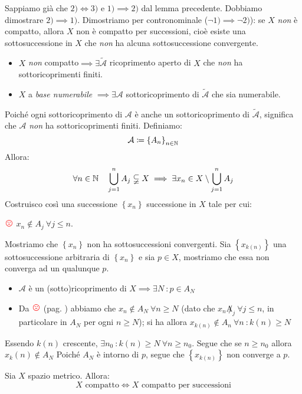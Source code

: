 \begin{demonstration}
Sappiamo già che $2)\iff 3)$ e $1)\implies 2)$ dal lemma precedente. Dobbiamo dimostrare $2)\implies 1)$. Dimostriamo per contronominale ($\neg 1)\implies \neg 2)$): se $X$ \textit{non} è compatto, allora $X$ non è compatto per successioni, cioè esiste una sottosuccessione in $X$ che \textit{non} ha alcuna sottosuccessione convergente.\\
\begin{itemize}
	\item $X$ \textit{non} compatto$\implies \exists \tilde{\mathcal{A}}$ ricoprimento aperto di $X$ che \textit{non} ha sottoricoprimenti finiti.
	\item $X$ a \textit{base numerabile} $\implies\exists\mathcal{A}$ sottoricoprimento di $\tilde{\mathcal{A}}$ che sia numerabile.
\end{itemize}
Poiché ogni sottoricoprimento di $\mathcal{A}$ è anche un sottoricoprimento di $\tilde{\mathcal{A}}$, significa che $\mathcal{A}$ \textit{non} ha sottoricoprimenti finiti. Definiamo:
\begin{equation*}
\mathcal{A}\coloneqq\left\{A_n\right\}_{n\in\mathbb{N}}
\end{equation*}
Allora:
\begin{equation*}
\forall n\in\mathbb{N}\quad \mathop{{\bigcup}}\displaylimits_{j=1}^n A_j\subsetneqq X\implies \exists x_n\in X\setminus \mathop{{\bigcup}}\displaylimits_{j=1}^n A_j
\end{equation*}
Costruisco così una successione $\left\{x_n\right\}$ successione in $X$ tale per cui:
\begin{center}
	\label{notatriste} $\textcolor{red}{{\large \frownie{}}}$ $x_n\notin A_j\ \forall j\leq n$.
\end{center}
Mostriamo che $\left\{x_n\right\}$ non ha sottosuccessioni convergenti. Sia $\left\{x_{k\left(n\right)}\right\}$ una sottosuccessione arbitraria di $\left\{x_n\right\}$ e sia $p\in X$, mostriamo che essa non converga ad un qualunque $p$.\\
\begin{itemize}
	\item $\mathcal{A}$ è un (sotto)ricoprimento di $X\implies \exists N\ \colon p\in A_N$
	\item Da $\textcolor{red}{{\large \frownie{}}}$ (pag. \pageref{notatriste}) abbiamo che $x_n\notin A_N\ \forall n\geq N$ (dato che $x_n\not A_j\ \forall j\leq n$, in particolare in $A_N$ per ogni $n\geq N$); si ha allora $x_{k\left(n\right)}\notin A_n\ \forall n\ \colon k\left(n\right)\geq N$
\end{itemize}
Essendo $k\left(n\right)$ crescente, $\exists n_0\ \colon k\left(n\right)\geq N\ \forall n\geq n_0$. Segue che se $n\geq n_0$ allora $x_k\left(n\right)\notin A_N$ 
Poiché $A_N$ è intorno di $p$, segue che $\left\{x_{k\left(n\right)}\right\}$ non converge a $p$.
\end{demonstration}
\begin{theorema}
Sia $X$ spazio metrico. Allora:
\begin{equation}
	X\text{ compatto}\iff X\text{ compatto per successioni}
\end{equation}
\end{theorema}
%
%

